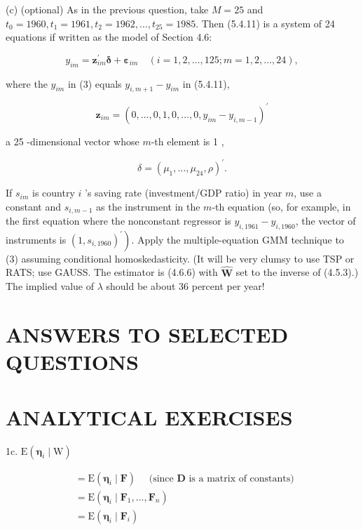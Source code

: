 \documentclass[10pt]{article}
\begin{document}
(c) (optional) As in the previous question, take $M=25$ and $t_{0}=1960, t_{1}= 1961, t_{2}=1962, \ldots, t_{25}=1985$. Then (5.4.11) is a system of 24 equations if written as the model of Section 4.6:


\begin{equation*}
y_{i m}=\mathbf{z}_{i m}^{\prime} \boldsymbol{\delta}+\boldsymbol{\varepsilon}_{i m} \quad(i=1,2, \ldots, 125 ; m=1,2, \ldots, 24), \tag{3}
\end{equation*}


where the $y_{i m}$ in (3) equals $y_{i, m+1}-y_{i m}$ in (5.4.11),

$$
\mathbf{z}_{i m}=\left(0, \ldots, 0,1,0, \ldots, 0, y_{i m}-y_{i, m-1}\right)^{\prime}
$$

a 25 -dimensional vector whose $m$-th element is 1 ,

$$
\delta=\left(\mu_{1}, \ldots, \mu_{24}, \rho\right)^{\prime} .
$$

If $s_{i m}$ is country $i$ 's saving rate (investment/GDP ratio) in year $m$, use a constant and $s_{i, m-1}$ as the instrument in the $m$-th equation (so, for example, in the first equation where the nonconstant regressor is $y_{i, 1961}-y_{i, 1960}$, the vector of instruments is $\left.\left(1, s_{i, 1960}\right)^{\prime}\right)$. Apply the multiple-equation GMM technique to (3) assuming conditional homoskedasticity. (It will be very clumsy to use TSP or RATS; use GAUSS. The estimator is (4.6.6) with $\widehat{\mathbf{W}}$ set to the inverse of (4.5.3).) The implied value of $\lambda$ should be about 36 percent per year!

\section*{ANSWERS TO SELECTED QUESTIONS}
\section*{ANALYTICAL EXERCISES}
1c. $\mathrm{E}\left(\boldsymbol{\eta}_{i} \mid \mathrm{W}\right)$

$$
\begin{aligned}
& =\mathrm{E}\left(\boldsymbol{\eta}_{i} \mid \mathbf{F}\right) \quad \text { (since } \mathbf{D} \text { is a matrix of constants) } \\
& =\mathrm{E}\left(\boldsymbol{\eta}_{i} \mid \mathbf{F}_{1}, \ldots, \mathbf{F}_{n}\right) \\
& =\mathrm{E}\left(\boldsymbol{\eta}_{i} \mid \mathbf{F}_{i}\right)
\end{aligned}
$$
\end{document}

